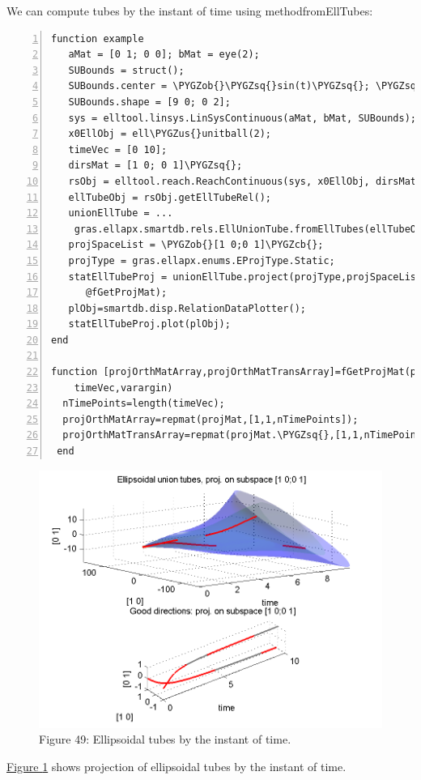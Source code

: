 \documentclass[letterpaper,10pt,english]{sphinxmanual}
\def\PYGZus{\char`\_}
\def\PYGZob{\char`\{}
\def\PYGZcb{\char`\}}
\def\PYGZsq{\char`\'}
\begin{document}
We can compute tubes by the instant of time using methodfromEllTubes:

\begin{Verbatim}[commandchars=\\\{\},numbers=left,firstnumber=1,stepnumber=1]
function example
   aMat = [0 1; 0 0]; bMat = eye(2);  
   SUBounds = struct();
   SUBounds.center = \PYGZob{}\PYGZsq{}sin(t)\PYGZsq{}; \PYGZsq{}cos(t)\PYGZsq{}\PYGZcb{};  
   SUBounds.shape = [9 0; 0 2]; 
   sys = elltool.linsys.LinSysContinuous(aMat, bMat, SUBounds);
   x0EllObj = ell\PYGZus{}unitball(2);
   timeVec = [0 10]; 
   dirsMat = [1 0; 0 1]\PYGZsq{};  
   rsObj = elltool.reach.ReachContinuous(sys, x0EllObj, dirsMat, timeVec);
   ellTubeObj = rsObj.getEllTubeRel();
   unionEllTube = ...
    gras.ellapx.smartdb.rels.EllUnionTube.fromEllTubes(ellTubeObj);
   projSpaceList = \PYGZob{}[1 0;0 1]\PYGZcb{};
   projType = gras.ellapx.enums.EProjType.Static;
   statEllTubeProj = unionEllTube.project(projType,projSpaceList,...
      @fGetProjMat);
   plObj=smartdb.disp.RelationDataPlotter();
   statEllTubeProj.plot(plObj);
end

function [projOrthMatArray,projOrthMatTransArray]=fGetProjMat(projMat,...
    timeVec,varargin)
  nTimePoints=length(timeVec);
  projOrthMatArray=repmat(projMat,[1,1,nTimePoints]);
  projOrthMatTransArray=repmat(projMat.\PYGZsq{},[1,1,nTimePoints]);
 end
\end{Verbatim}
\begin{figure}[htbp]
\centering
\capstart

\includegraphics[width=0.700\linewidth]{chapter05_section03_unionTubeStatProj.png}
\caption{Figure 49: Ellipsoidal tubes by the instant of time.}\label{chap_implement:uniontubestatproj}\end{figure}

\hyperref[chap_implement:uniontubestatproj]{Figure  \ref*{chap_implement:uniontubestatproj}} shows projection of ellipsoidal
tubes by the instant of time.
\end{document}
